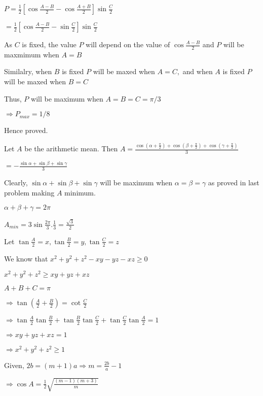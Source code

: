   $P = \frac{1}{2}\left[\cos\frac{A - B}{2} - \cos\frac{A + B}{2}\right]\sin\frac{C}{2}$

  $= \frac{1}{2}\left[\cos \frac{A - B}{2} - \sin\frac{C}{2}\right]\sin\frac{C}{2}$

  As $C$ is fixed, the value $P$ will depend on the value of $\cos\frac{A - B}{2}$ and $P$ will be
  maxmimum when $A = B$

  Similalry, when $B$ is fixed $P$ will be maxed when $A = C,$ and when $A$ is fixed $P$ will be
  maxed when $B = C$

  Thus, $P$ will be maximum when $A = B = C = \pi/3$

  $\Rightarrow P_{max} = 1/8$

  Hence proved.

\item Let $A$ be the arithmetic mean. Then $A = \frac{\cos\left(\alpha + \frac{\pi}{2}\right) + \cos\left(\beta +
  \frac{\pi}{2}\right) + \cos\left(\gamma + \frac{\pi}{2}\right)}{3}$

  $= -\frac{\sin\alpha + \sin\beta + \sin\gamma}{3}$

  Clearly, $\sin\alpha + \sin\beta + \sin\gamma$ will be maximum when $\alpha = \beta = \gamma$ as proved in last
  problem making $A$ minimum.

  $\alpha + \beta + \gamma = 2\pi$

  $A_{min} = 3\sin\frac{2\pi}{3}.\frac{1}{3} = \frac{\sqrt{3}}{2}$

\item Let $\tan\frac{A}{2} = x, \tan\frac{B}{2} = y, \tan\frac{C}{2} = z$


  We know that $x^2 + y^2 + z^2 - xy - yz - xz \geq 0$

  $x^2 + y^2 + z^2 \geq xy + yz + xz$

  $A + B + C = \pi$

  $\Rightarrow \tan\left(\frac{A}{2} + \frac{B}{2}\right) = \cot\frac{C}{2}$

  $\Rightarrow \tan\frac{A}{2}\tan\frac{B}{2} + \tan\frac{B}{2}\tan\frac{C}{2} + \tan\frac{C}{2}\tan\frac{A}{2} = 1$

  $\Rightarrow xy + yz + xz = 1$

  $\Rightarrow x^2 + y^2 + z^2 \geq 1$

\item Given, $2b = (m + 1)a \Rightarrow m = \frac{2b}{a} - 1$

  $\Rightarrow \cos A = \frac{1}{2}\sqrt{\frac{(m - 1)(m + 3)}{m}}$

